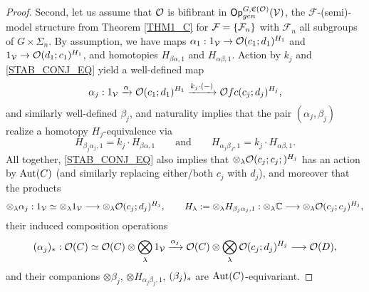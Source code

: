 \documentclass[a4paper,10pt
,draft
]{article}%
\renewcommand{\F}{\mathcal F}
\renewcommand{\1}{\eta}%
\begin{document}
\begin{proof}
      Second, let us assume that $\mathcal{O}$ is bifibrant in $\mathsf{Op}^{G, \mathfrak C(\mathcal{O})}_{gen}(\mathcal V)$,
      the $\F$-(semi)-model structure from Theorem \ref{THM1_C} for $\F = \set{\F_n}$ with $\F_n$ all subgroups of $G \times \Sigma_n$.
      By assumption, we have maps 
      $\alpha_1: 1_{\mathcal V} \to \mathcal{O}(c_1;d_1)^{H_1}$ and $1_{\mathcal V} \to \mathcal{O}(d_1;c_1)^{H_1}$,
      and homotopies $H_{\beta\alpha,1}$ and $H_{\alpha\beta,1}$.
      Action by $k_j$ and \eqref{STAB_CONJ_EQ} yield a well-defined map
      \[
            \alpha_j: 1_{\mathcal V} \xrightarrow{\alpha} \mathcal{O}(c_1;d_1)^{H_1} \xrightarrow{k_j \cdot (-)} \mathcal{O}{fc}(c_j; d_j)^{H_j},
      \]
      and similarly well-defined $\beta_j$,
      and naturality implies that the pair $(\alpha_j,\beta_j)$ realize a homotopy $H_j$-equivalence
      via
      \[
            H_{\beta_j\alpha_j,1} = k_j \cdot H_{\beta\alpha,1}
            \qquad \textrm{and} \qquad
            H_{\alpha_j \beta_J, 1} = k_j \cdot H_{\alpha\beta,1}.
      \]
      All together, \eqref{STAB_CONJ_EQ} also implies that $\otimes_\lambda \mathcal{O}(c_j; c_j;)^{H_j}$ has an action by $\operatorname{Aut}(C)$
      (and similarly replacing either/both $c_j$ with $d_j$),
      and moreover that the products
      \[
            \otimes_\lambda \alpha_j: 1_{\mathcal V} \simeq \otimes_\lambda 1_{\mathcal V} \longrightarrow \otimes_\lambda \mathcal{O}(c_j; d_j)^{H_j},
            \qquad
            H_\lambda := \otimes_\lambda H_{\beta_j\alpha_j, 1}: \otimes_\lambda \mathbb C \longrightarrow \otimes_\lambda \mathcal{O}(c_j;c_j)^{H_j},
      \]
      their induced composition operations
      \[
            (\alpha_j)_{\**}: \O(C) \simeq \O(C) \otimes \bigotimes_\lambda 1_\V \xrightarrow{\alpha_j}
            \O(C) \otimes \bigotimes_\lambda \O(c_j; d_j)^{H_j} \longto \O(D),
      \]
      and their companions $\otimes \beta_j$, $\otimes H_{\alpha_j\beta_j,1}$, $(\beta_j)_{\**}$
      are $\operatorname{Aut}(C)$-equivariant.


\end{proof}
\end{document}
